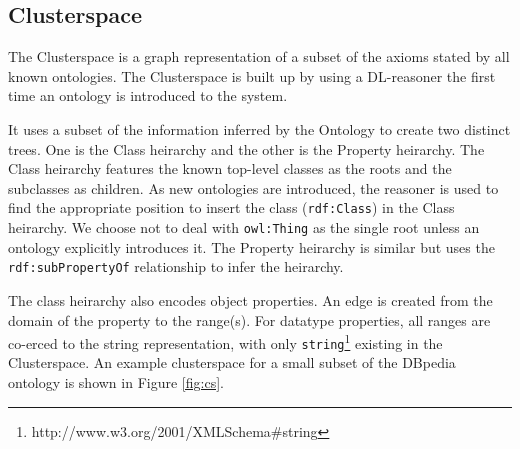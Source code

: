 \documentclass[journal]{IEEEtran}
\begin{document}
\subsection{Clusterspace}
The Clusterspace is a graph representation of a subset of the axioms stated by
all known ontologies. The Clusterspace is built up by using a DL-reasoner the
first time an ontology is introduced to the system.

It uses a subset of the information inferred by the Ontology to create two
distinct trees. One is the Class heirarchy and the other is the Property
heirarchy. The Class heirarchy features the known top-level classes as the
roots and the subclasses as children. As new ontologies are introduced, the
reasoner is used to find the appropriate position to insert the class
(\texttt{rdf:Class}) in the Class heirarchy. We choose not to deal with
\texttt{owl:Thing} as the single root unless an ontology explicitly introduces
it. The Property heirarchy is similar but uses the \texttt{rdf:subPropertyOf}
relationship to infer the heirarchy.

The class heirarchy also encodes object properties. An edge is created from the
domain of the property to the range(s). For datatype properties, all ranges are
co-erced to the string representation, with only
\texttt{string}\footnote{http://www.w3.org/2001/XMLSchema\#string} existing in
the Clusterspace. An example clusterspace for a small subset of the DBpedia
ontology is shown in Figure \ref{fig:cs}.
\end{document}
